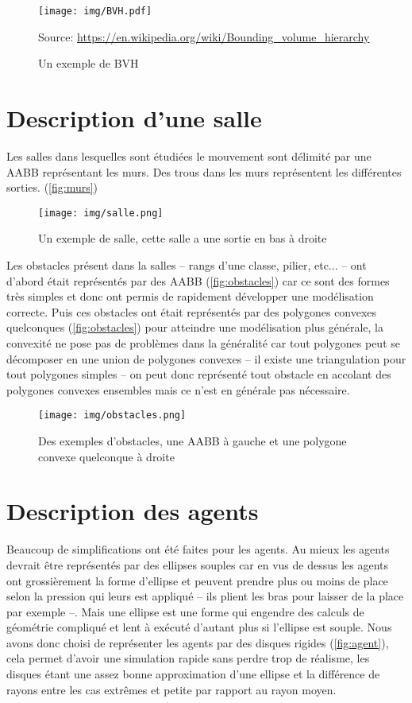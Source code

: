 \documentclass{article}
\newcommand{\source}[1]{\caption*{Source: #1}}
\begin{document}
\begin{figure}[h]
  \centering
  \texttt{[image: img/BVH.pdf]}
  \caption{Un exemple de BVH}
  \source{\url{https://en.wikipedia.org/wiki/Bounding_volume_hierarchy}}
  \label{fig:BVH}
\end{figure}

\section{Description d'une salle}

Les salles dans lesquelles sont étudiées le mouvement sont délimité par
une AABB représentant les murs. Des trous dans les murs représentent les
différentes sorties. (\autoref{fig:murs})

\begin{figure}[h]
  \centering
  \texttt{[image: img/salle.png]}
  \caption{Un exemple de salle, cette salle a une sortie en bas à droite}
  \label{fig:murs}
\end{figure}

Les obstacles présent dans la salles -- rangs d'une classe, pilier, etc... --
ont d'abord était représentés par des AABB (\autoref{fig:obstacles}) car ce
sont des formes très simples
et donc ont permis de rapidement développer une modélisation correcte. Puis
ces obstacles ont était représentés par des polygones convexes quelconques
(\autoref{fig:obstacles}) pour atteindre une modélisation plus générale, la convexité
ne pose pas
de problèmes dans la généralité car tout polygones peut se décomposer en une
union de polygones convexes -- il existe une triangulation pour tout
polygones simples -- on peut donc représenté tout obstacle en accolant des
polygones convexes ensembles mais ce n'est en générale pas nécessaire.

\begin{figure}[h]
  \centering
  \texttt{[image: img/obstacles.png]}
  \caption{Des exemples d'obstacles, une AABB à gauche et une polygone
    convexe quelconque à droite}
  \label{fig:obstacles}
\end{figure}


\section{Description des agents}

Beaucoup de simplifications ont été faites pour les agents. Au mieux les agents
devrait être représentés par des ellipses souples car en vus de dessus les agents
ont grossièrement la forme d'ellipse et peuvent prendre plus ou moins de place
selon la pression qui leurs est appliqué -- ils plient les bras pour laisser de
la place par exemple --. Mais une ellipse est une forme qui engendre des calculs
de géométrie compliqué et lent à exécuté d'autant plus si l'ellipse est souple.
Nous avons donc choisi de représenter les agents par des disques rigides
(\autoref{fig:agent}),
cela permet d'avoir une simulation rapide sans perdre trop de réalisme, les
disques étant une assez bonne approximation d'une ellipse et la différence
de rayons entre les cas extrêmes et petite par rapport au rayon moyen.
\end{document}

